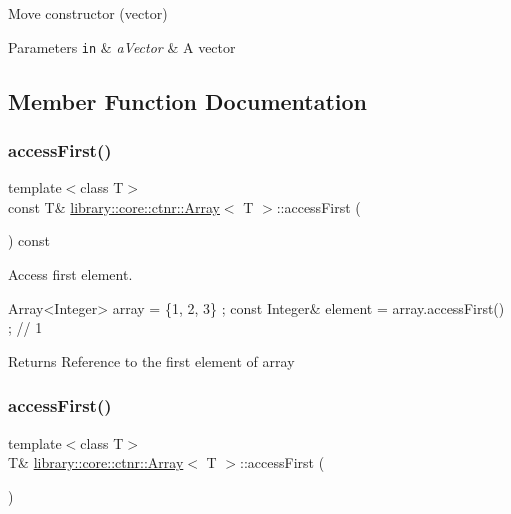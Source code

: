 Move constructor (vector) 


\begin{DoxyParams}[1]{Parameters}
\mbox{\tt in}  & {\em a\+Vector} & A vector \\
\hline
\end{DoxyParams}


\subsection{Member Function Documentation}
\mbox{\label{classlibrary_1_1core_1_1ctnr_1_1_array_afea012716d6cfffa2803606c0b244419}} 
\subsubsection{\texorpdfstring{access\+First()}{accessFirst()}\hspace{0.1cm}{\footnotesize\ttfamily [1/2]}}
{\footnotesize\ttfamily template$<$class T$>$ \\
const T\& \hyperlink{classlibrary_1_1core_1_1ctnr_1_1_array}{library\+::core\+::ctnr\+::\+Array}$<$ T $>$\+::access\+First (\begin{DoxyParamCaption}{ }\end{DoxyParamCaption}) const}



Access first element. 


\begin{DoxyCode}
Array<Integer> array = \{1, 2, 3\} ;
\textcolor{keyword}{const} Integer& element = array.accessFirst() ; \textcolor{comment}{// 1}
\end{DoxyCode}


\begin{DoxyReturn}{Returns}
Reference to the first element of array 
\end{DoxyReturn}
\mbox{\label{classlibrary_1_1core_1_1ctnr_1_1_array_abb2068e46720e8df057b5410ac8879d5}} 
\subsubsection{\texorpdfstring{access\+First()}{accessFirst()}\hspace{0.1cm}{\footnotesize\ttfamily [2/2]}}
{\footnotesize\ttfamily template$<$class T$>$ \\
T\& \hyperlink{classlibrary_1_1core_1_1ctnr_1_1_array}{library\+::core\+::ctnr\+::\+Array}$<$ T $>$\+::access\+First (\begin{DoxyParamCaption}{ }\end{DoxyParamCaption})}



